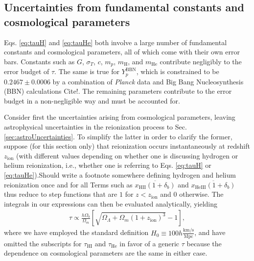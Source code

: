 \documentclass[twocolumn,aps,prd,nofootinbib,showpacs]{revtex4-1}
\begin{document}
\subsection{Uncertainties from fundamental constants and cosmological parameters}

Eqs. \eqref{eq:tauH} and \eqref{eq:tauHe} both involve a large number of fundamental constants and cosmological parameters, all of which come with their own error bars. Constants such as $G$, $\sigma_T$, $c$, $m_p$, $m_\textrm{H}$, and $m_\textrm{He}$ contribute negligibly to the error budget of $\tau$. The same is true for $Y_p^\textrm{BBN}$, which is constrained to be $0.2467\pm0.0006$ by a combination of \emph{Planck} data and Big Bang Nucleosynthesis (BBN) calculations \acl{Cite!}. The remaining parameters contribute to the error budget in a non-negligible way and must be accounted for.

Consider first the uncertainties arising from cosmological parameters, leaving astrophysical uncertainties in the reionization process to Sec. \ref{sec:astroUncertainties}. To simplify the latter in order to clarify the former, suppose (for this section only) that reionization occurs instantaneously at redshift $z_\textrm{ion}$ (with different values depending on whether one is discussing hydrogen or helium reionization, i.e., whether one is referring to Eqs. \ref{eq:tauH} or \ref{eq:tauHe}).\acl{Should write a footnote somewhere defining hydrogen and helium reionization once and for all} Terms such as $\overline{x_\textrm{HII} (1+\delta_b)}$ and $\overline{x_\textrm{HeIII} (1+\delta_b)}$ thus reduce to step functions that are $1$ for $z<z_\textrm{ion}$ and $0$ otherwise. The integrals in our expressions can then be evaluated analytically, yielding
\begin{eqnarray}
\label{eq:exactConstant}
\tau \propto \frac{h \Omega_b }{\Omega_m} \left[ \sqrt{\Omega_\Lambda + \Omega_m (1+z_\textrm{ion})^3} - 1 \right],
\end{eqnarray}
where we have employed the standard definition $H_0 \equiv 100h \frac{\textrm{km}/\textrm{s}}{\textrm{Mpc}}$, and have omitted the subscripts for $\tau_\textrm{HI}$ and $\tau_\textrm{He}$ in favor of a generic $\tau$ because the dependence on cosmological parameters are the same in either case.
\end{document}
